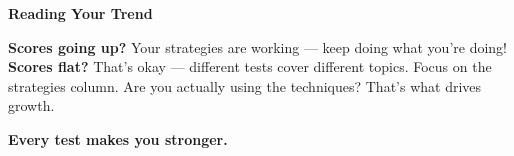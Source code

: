 {\begin{tcolorbox}[
    enhanced,
    colback=funGreenLight,
    colframe=funGreen!50,
    arc=10pt,
    boxrule=1pt,
    left=6mm, right=6mm, top=4mm, bottom=4mm,
]
{\bfseries\color{funGreenDark} \faThumbsUp\hspace{2mm}Reading Your Trend}

\vspace{2mm}

\textbf{Scores going up?} Your strategies are working — keep doing what you're doing! \textbf{Scores flat?} That's okay — different tests cover different topics. Focus on the strategies column. Are you actually using the techniques? That's what drives growth.
\end{tcolorbox}

\vspace{4mm}

\begin{center}
{\large\bfseries\color{funPurpleDark} \faStar\hspace{2mm}Every test makes you stronger.\hspace{2mm}\faStar}
\end{center}

}
\newpage
